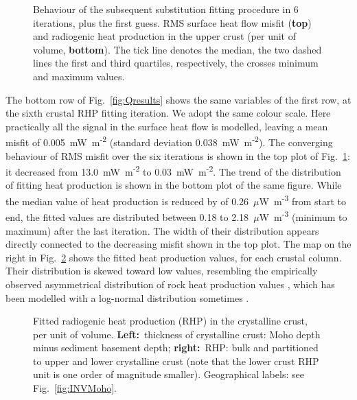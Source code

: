 {\begin{figure}
	\begin{adjustbox}{center}
	\end{adjustbox}
	\caption{Behaviour of the subsequent substitution fitting procedure in 6 iterations, plus the first guess. RMS surface heat flow misfit (\textbf{top}) and radiogenic heat production in the upper crust (per unit of volume, \textbf{bottom}). The tick line denotes the median, the two dashed lines the first and third quartiles, respectively, the crosses minimum and maximum values.}
	\label{fig:RMSvsITN}
\end{figure}

The bottom row of Fig.~\ref{fig:Qresults} shows the same variables of the first row, at the sixth crustal RHP fitting iteration.
We adopt the same colour scale.
Here practically all the signal in the surface heat flow is modelled, leaving a mean misfit of 0.005~{mW~m\textsuperscript{-2}} (standard deviation 0.038~{mW~m\textsuperscript{-2}}).
The converging behaviour of RMS misfit over the six iterations is shown in the top plot of Fig.~\ref{fig:RMSvsITN}: it decreased from 13.0~{mW~m\textsuperscript{-2}} to 0.03~{mW~m\textsuperscript{-2}}.
The trend of the distribution of fitting heat production is shown in the bottom plot of the same figure.
While the median value of heat production is reduced by of 0.26~{$\mu$W~m\textsuperscript{-3}} from start to end, the fitted values are distributed between 0.18 to 2.18~{$\mu$W~m\textsuperscript{-3}} (minimum to maximum) after the last iteration.
The width of their distribution appears directly connected to the decreasing misfit shown in the top plot.
The map on the right in Fig.~\ref{fig:Aresults} shows the fitted heat production values, for each crustal column.
Their distribution is skewed toward low values, resembling the empirically observed asymmetrical distribution of rock heat production values \parencites{Vila2010}{Artemieva2017granite}{Hasterok2017_ign}, which has been modelled with a log-normal distribution sometimes \parencites[e.g. ][]{Jokinen1999}{Huang2013}.

\begin{figure}
	\begin{adjustbox}{center}
	\end{adjustbox}
	\caption{Fitted radiogenic heat production (RHP) in the crystalline crust, per unit of volume. \textbf{Left:}~thickness of crystalline crust: Moho depth minus sediment basement depth; \textbf{right:}~RHP: bulk and partitioned to upper and lower crystalline crust (note that the lower crust RHP unit is one order of magnitude smaller). Geographical labels: see Fig.~\ref{fig:INVMoho}.}
	\label{fig:Aresults}
\end{figure}

}
